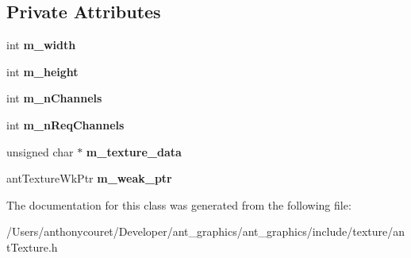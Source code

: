 \subsection*{Private Attributes}
\begin{DoxyCompactItemize}
\item 
\hypertarget{classant_texture_ade1b18b60443c11a750be1ff4c4e49b2}{int {\bfseries m\+\_\+width}}\label{classant_texture_ade1b18b60443c11a750be1ff4c4e49b2}

\item 
\hypertarget{classant_texture_a3a5886f800ff0cdf273a2eb3bdf93a15}{int {\bfseries m\+\_\+height}}\label{classant_texture_a3a5886f800ff0cdf273a2eb3bdf93a15}

\item 
\hypertarget{classant_texture_a6b48a2c81aa5739d0fe7494ac8924732}{int {\bfseries m\+\_\+n\+Channels}}\label{classant_texture_a6b48a2c81aa5739d0fe7494ac8924732}

\item 
\hypertarget{classant_texture_ac8aff5d0908959bf88a1c7860b7808df}{int {\bfseries m\+\_\+n\+Req\+Channels}}\label{classant_texture_ac8aff5d0908959bf88a1c7860b7808df}

\item 
\hypertarget{classant_texture_a797deb11ecf747457dbe5abcd54df7a0}{unsigned char $\ast$ {\bfseries m\+\_\+texture\+\_\+data}}\label{classant_texture_a797deb11ecf747457dbe5abcd54df7a0}

\item 
\hypertarget{classant_texture_a78aecdbf075ec87a470b905449b1cd9e}{ant\+Texture\+Wk\+Ptr {\bfseries m\+\_\+weak\+\_\+ptr}}\label{classant_texture_a78aecdbf075ec87a470b905449b1cd9e}

\end{DoxyCompactItemize}


The documentation for this class was generated from the following file\+:\begin{DoxyCompactItemize}
\item 
/\+Users/anthonycouret/\+Developer/ant\+\_\+graphics/ant\+\_\+graphics/include/texture/ant\+Texture.\+h\end{DoxyCompactItemize}
